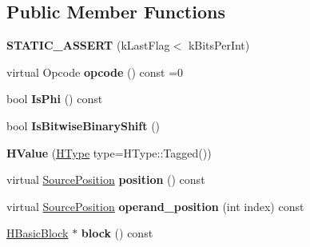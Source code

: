 \subsection*{Public Member Functions}
\begin{DoxyCompactItemize}
\item 
{\bfseries S\+T\+A\+T\+I\+C\+\_\+\+A\+S\+S\+E\+RT} (k\+Last\+Flag$<$ k\+Bits\+Per\+Int)\hypertarget{classv8_1_1internal_1_1_h_value_ac99b86fe722461f3979d675a15ef38ff}{}\label{classv8_1_1internal_1_1_h_value_ac99b86fe722461f3979d675a15ef38ff}

\item 
virtual Opcode {\bfseries opcode} () const  =0\hypertarget{classv8_1_1internal_1_1_h_value_a943429e8d69ea79af2b476ded593b5ae}{}\label{classv8_1_1internal_1_1_h_value_a943429e8d69ea79af2b476ded593b5ae}

\item 
bool {\bfseries Is\+Phi} () const \hypertarget{classv8_1_1internal_1_1_h_value_ade74fdf3cc621f6d81d5d5005a4783f3}{}\label{classv8_1_1internal_1_1_h_value_ade74fdf3cc621f6d81d5d5005a4783f3}

\item 
bool {\bfseries Is\+Bitwise\+Binary\+Shift} ()\hypertarget{classv8_1_1internal_1_1_h_value_acb00fedefa4b7bbe2cdda3dbbed9b392}{}\label{classv8_1_1internal_1_1_h_value_acb00fedefa4b7bbe2cdda3dbbed9b392}

\item 
{\bfseries H\+Value} (\hyperlink{classv8_1_1internal_1_1_h_type}{H\+Type} type=H\+Type\+::\+Tagged())\hypertarget{classv8_1_1internal_1_1_h_value_a0e4f64e9d8d319e0211ca68b7692696f}{}\label{classv8_1_1internal_1_1_h_value_a0e4f64e9d8d319e0211ca68b7692696f}

\item 
virtual \hyperlink{classv8_1_1internal_1_1_source_position}{Source\+Position} {\bfseries position} () const \hypertarget{classv8_1_1internal_1_1_h_value_a10978d64d8d4819a80893b5e18bd4588}{}\label{classv8_1_1internal_1_1_h_value_a10978d64d8d4819a80893b5e18bd4588}

\item 
virtual \hyperlink{classv8_1_1internal_1_1_source_position}{Source\+Position} {\bfseries operand\+\_\+position} (int index) const \hypertarget{classv8_1_1internal_1_1_h_value_a38b0b4c4d75e267cd61ea9734eec3680}{}\label{classv8_1_1internal_1_1_h_value_a38b0b4c4d75e267cd61ea9734eec3680}

\item 
\hyperlink{classv8_1_1internal_1_1_h_basic_block}{H\+Basic\+Block} $\ast$ {\bfseries block} () const \hypertarget{classv8_1_1internal_1_1_h_value_a201313d2353082a0c3ff8e84bfd921bf}{}\label{classv8_1_1internal_1_1_h_value_a201313d2353082a0c3ff8e84bfd921bf}


\end{DoxyCompactItemize}
